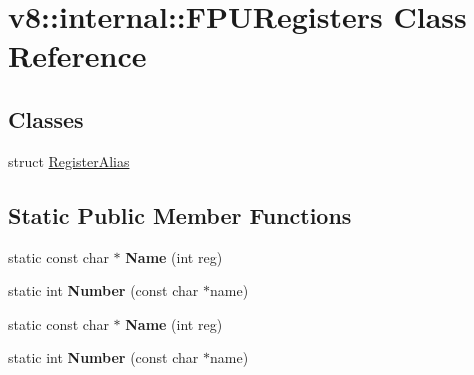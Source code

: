 \hypertarget{classv8_1_1internal_1_1_f_p_u_registers}{}\section{v8\+:\+:internal\+:\+:F\+P\+U\+Registers Class Reference}
\label{classv8_1_1internal_1_1_f_p_u_registers}
\subsection*{Classes}
\begin{DoxyCompactItemize}
\item 
struct \hyperlink{structv8_1_1internal_1_1_f_p_u_registers_1_1_register_alias}{Register\+Alias}
\end{DoxyCompactItemize}
\subsection*{Static Public Member Functions}
\begin{DoxyCompactItemize}
\item 
static const char $\ast$ {\bfseries Name} (int reg)\hypertarget{classv8_1_1internal_1_1_f_p_u_registers_a41da2287371f264eb90d3ea1920f695e}{}\label{classv8_1_1internal_1_1_f_p_u_registers_a41da2287371f264eb90d3ea1920f695e}

\item 
static int {\bfseries Number} (const char $\ast$name)\hypertarget{classv8_1_1internal_1_1_f_p_u_registers_a2b6d1b5b43862af2b655f2e8e5d434f0}{}\label{classv8_1_1internal_1_1_f_p_u_registers_a2b6d1b5b43862af2b655f2e8e5d434f0}

\item 
static const char $\ast$ {\bfseries Name} (int reg)\hypertarget{classv8_1_1internal_1_1_f_p_u_registers_a41da2287371f264eb90d3ea1920f695e}{}\label{classv8_1_1internal_1_1_f_p_u_registers_a41da2287371f264eb90d3ea1920f695e}

\item 
static int {\bfseries Number} (const char $\ast$name)\hypertarget{classv8_1_1internal_1_1_f_p_u_registers_a2b6d1b5b43862af2b655f2e8e5d434f0}{}\label{classv8_1_1internal_1_1_f_p_u_registers_a2b6d1b5b43862af2b655f2e8e5d434f0}

\end{DoxyCompactItemize}
